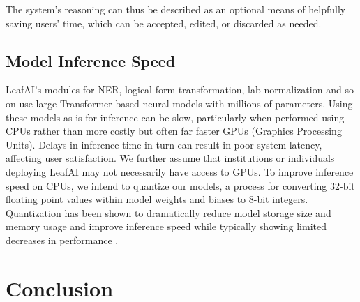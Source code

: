 \documentclass[../main.tex]{subfiles}
\begin{document}
The system's reasoning can thus be described as an optional means of helpfully saving users' time, which can be accepted, edited, or discarded as needed.

\subsection{Model Inference Speed}

LeafAI's modules for NER, logical form transformation, lab normalization and so on use large Transformer-based neural models \cite{vaswani2017attention} with millions of parameters. Using these models as-is for inference can be slow, particularly when performed using CPUs rather than more costly but often far faster GPUs (Graphics Processing Units). Delays in inference time in turn can result in poor system latency, affecting user satisfaction. We further assume that institutions or individuals deploying LeafAI may not necessarily have access to GPUs. To improve inference speed on CPUs, we intend to quantize our models, a process for converting 32-bit floating point values within model weights and biases to 8-bit integers. Quantization has been shown to dramatically reduce model storage size and memory usage and improve inference speed while typically showing limited decreases in performance \cite{hubara2017quantized}. 

\section{Conclusion}
\end{document}
